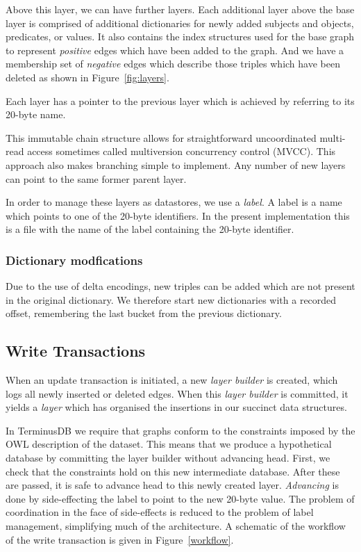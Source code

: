 \documentclass[10pt, a4paper, twocolumn]{article} %
\begin{document}
Above this layer, we can have further layers. Each additional layer
above the base layer is comprised of additional dictionaries for newly
added subjects and objects, predicates, or values. It also contains the
index structures used for the base graph to represent {\em positive}
edges which have been added to the graph. And we have a membership set
of {\em negative} edges which describe those triples which have been
deleted as shown in Figure~\ref{fig:layers}.

Each layer has a pointer to the previous layer which is achieved by
referring to its 20-byte name.

This immutable chain structure allows for straightforward uncoordinated
multi-read access sometimes called multiversion concurrency control
(MVCC)\autocite{Mohan:1992:EFM:130283.130306}\autocite{Sadoghi:2014:RDL:2733004.2733006}. This
approach also makes branching simple to implement. Any number of new
layers can point to the same former parent layer.

In order to manage these layers as datastores, we use a {\em label}. A
label is a name which points to one of the 20-byte identifiers. In the
present implementation this is a file with the name of the label
containing the 20-byte identifier.

\subsubsection{Dictionary modfications}

Due to the use of delta encodings, new triples can be added which are
not present in the original dictionary. We therefore start new
dictionaries with a recorded offset, remembering the last bucket from
the previous dictionary.

\subsection{Write Transactions}

When an update transaction is initiated, a new {\em layer builder} is
created, which logs all newly inserted or deleted edges. When this
{\em layer builder} is committed, it yields a {\em layer} which has
organised the insertions in our succinct data structures.

In TerminusDB we require that graphs conform to the constraints
imposed by the OWL description of the dataset. This means that we
produce a hypothetical database by committing the layer builder
without advancing head. First, we check that the constraints hold on this
new intermediate database. After these are passed, it is safe to
advance head to this newly created layer. {\em Advancing} is done by
side-effecting the label to point to the new 20-byte value. The
problem of coordination in the face of side-effects is reduced to the
problem of label management, simplifying much of the architecture. A
schematic of the workflow of the write transaction is given in
Figure~\ref{workflow}.
\end{document}

